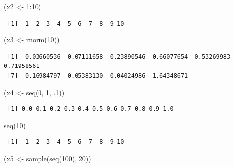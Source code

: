 \documentclass[
]{book}
\newenvironment{Shaded}{\begin{snugshade}}{\end{snugshade}}
\newcommand{\DecValTok}[1]{\textcolor[rgb]{0.00,0.00,0.81}{#1}}
\newcommand{\FunctionTok}[1]{\textcolor[rgb]{0.00,0.00,0.00}{#1}}
\newcommand{\NormalTok}[1]{#1}
\newcommand{\OtherTok}[1]{\textcolor[rgb]{0.56,0.35,0.01}{#1}}
\newcommand{\SpecialCharTok}[1]{\textcolor[rgb]{0.00,0.00,0.00}{#1}}
\begin{document}
\begin{Shaded}
\begin{Highlighting}[]
\NormalTok{(x2 }\OtherTok{\textless{}{-}} \DecValTok{1}\SpecialCharTok{:}\DecValTok{10}\NormalTok{)}
\end{Highlighting}
\end{Shaded}

\begin{verbatim}
 [1]  1  2  3  4  5  6  7  8  9 10
\end{verbatim}

\begin{Shaded}
\begin{Highlighting}[]
\NormalTok{(x3 }\OtherTok{\textless{}{-}} \FunctionTok{rnorm}\NormalTok{(}\DecValTok{10}\NormalTok{))}
\end{Highlighting}
\end{Shaded}

\begin{verbatim}
 [1]  0.03660536 -0.07111658 -0.23890546  0.66077654  0.53269983  0.71958561
 [7] -0.16984797  0.05383130  0.04024986 -1.64348671
\end{verbatim}

\begin{Shaded}
\begin{Highlighting}[]
\NormalTok{(x4 }\OtherTok{\textless{}{-}} \FunctionTok{seq}\NormalTok{(}\DecValTok{0}\NormalTok{, }\DecValTok{1}\NormalTok{, .}\DecValTok{1}\NormalTok{))}
\end{Highlighting}
\end{Shaded}

\begin{verbatim}
 [1] 0.0 0.1 0.2 0.3 0.4 0.5 0.6 0.7 0.8 0.9 1.0
\end{verbatim}

\begin{Shaded}
\begin{Highlighting}[]
\FunctionTok{seq}\NormalTok{(}\DecValTok{10}\NormalTok{)}
\end{Highlighting}
\end{Shaded}

\begin{verbatim}
 [1]  1  2  3  4  5  6  7  8  9 10
\end{verbatim}

\begin{Shaded}
\begin{Highlighting}[]
\NormalTok{(x5 }\OtherTok{\textless{}{-}} \FunctionTok{sample}\NormalTok{(}\FunctionTok{seq}\NormalTok{(}\DecValTok{100}\NormalTok{), }\DecValTok{20}\NormalTok{))}
\end{Highlighting}
\end{Shaded}
\end{document}
